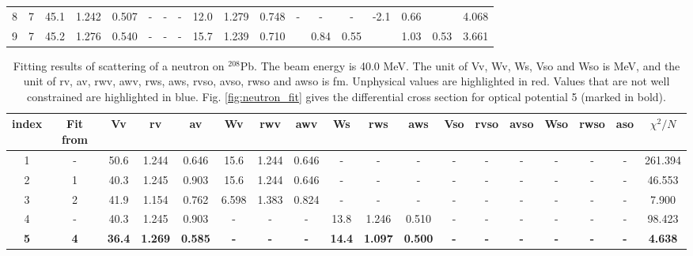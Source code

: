 \begin{landscape}
\begin{table}[t]
\begin{tabular}{cccccccccccccccccc}
			8     & 7          & 45.1     & 1.242   & 0.507    & -        & -        & -        & 12.0     & 1.279    & 0.748    & -         & -         & -         & -2.1     & 0.66     & \color{red}{-0.028}   & 4.068    \\
			9     & 7          & 45.2     & 1.276   & 0.540    & -        & -        & -        & 15.7     & 1.239    & 0.710    & \color{blue}{-6.9}     & 0.84    & 0.55  & \color{blue}{-8.0}  & 1.03  & 0.53     & 3.661   \\
			\hline
			\hline
		\end{tabular}
	\end{table}

\begin{table}[b]
	\centering
	\caption{Fitting results of scattering of a neutron on $^{208}$Pb. The beam energy is 40.0 MeV. 
			The unit of Vv, Wv, Ws, Vso and Wso is MeV, and the unit of rv, av, rwv, awv, rws, aws, rvso, avso, rwso and awso is fm. 
			Unphysical values are highlighted in red. Values that are not well constrained are highlighted in blue. 
     		Fig. \ref{fig:neutron_fit} gives the differential cross section for optical potential 5 (marked in bold). }
	\label{neutron_table}
	\footnotesize
	\begin{tabular}{cccccccccccccccccc}
		\hline
		\hline
		index & Fit from & Vv   & rv    & av    & Wv    & rwv   & awv   & Ws   & rws   & aws   & Vso & rvso  & avso & Wso   & rwso & aso  & $\chi^2/N$ \\
		\hline
		1     & -        & 50.6 & 1.244 & 0.646 & 15.6  & 1.244 & 0.646 & -    & -     & -     & -   & -     & -    & -     & -    & -    & 261.394    \\
		2     & 1        & 40.3 & 1.245 & 0.903 & 15.6  & 1.244 & 0.646 & -    & -     & -     & -   & -     & -    & -     & -    & -    & 46.553     \\
		3     & 2        & 41.9 & 1.154 & 0.762 & 6.598 & 1.383 & 0.824 & -    & -     & -     & -   & -     & -    & -     & -    & -    & 7.900      \\
		4     & -        & 40.3 & 1.245 & 0.903 & -     & -     & -     & 13.8 & 1.246 & 0.510 & -   & -     & -    & -     & -    & -    & 98.423     \\
		\textbf{5}     & \textbf{4}        & \textbf{36.4} & \textbf{1.269} & \textbf{0.585} & \textbf{-}     & \textbf{-}     & \textbf{-}     & \textbf{14.4} & \textbf{1.097} & \textbf{0.500} & \textbf{-}   & \textbf{-}     & \textbf{-}    & \textbf{-}     & \textbf{-}    & \textbf{-}    & \textbf{4.638}      \\

\end{tabular}
\end{table}
\end{landscape}
